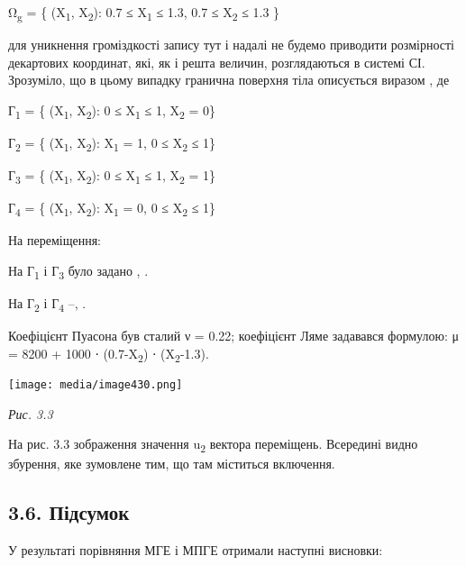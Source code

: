 Ω\textsubscript{g} = \{ (X\textsubscript{1}, X\textsubscript{2}): 0.7 ≤
X\textsubscript{1} ≤ 1.3, 0.7 ≤ X\textsubscript{2} ≤ 1.3 \}

для уникнення громіздкості запису тут і надалі не будемо приводити
розмірності декартових координат, які, як і решта величин, розглядаються
в системі СІ. Зрозуміло, що в цьому випадку гранична поверхня тіла
описується виразом , де

Г\textsubscript{1} = \{ (X\textsubscript{1}, X\textsubscript{2­}): 0 ≤
X\textsubscript{1} ≤ 1, X\textsubscript{2} = 0\}

Г\textsubscript{2} = \{ (X\textsubscript{1}, X\textsubscript{2­}):
X\textsubscript{1} = 1, 0 ≤ X\textsubscript{2} ≤ 1\}

Г\textsubscript{3} = \{ (X\textsubscript{1}, X\textsubscript{2­}): 0 ≤
X\textsubscript{1} ≤ 1, X\textsubscript{2} = 1\}

Г\textsubscript{4} = \{ (X\textsubscript{1}, X\textsubscript{2­}):
X\textsubscript{1} = 0, 0 ≤ X\textsubscript{2} ≤ 1\}

На переміщення:

На Г\textsubscript{1} і Г\textsubscript{3} було задано , .

На Г\textsubscript{2} і Г\textsubscript{4} --, .

Коефіцієнт Пуасона був сталий ν = 0.22; коефіцієнт Ляме задавався
формулою: μ = 8200 + 1000 ⋅ (0.7-X\textsubscript{2}) ⋅
(X\textsubscript{2}-1.3).

\texttt{[image: media/image430.png]}

\emph{Рис. 3.3}

На рис. 3.3 зображення значення u\textsubscript{2} вектора переміщень.
Всередині видно збурення, яке зумовлене тим, що там міститься включення.

\hypertarget{ux43fux456ux434ux441ux443ux43cux43eux43a-1}{%
\subsection{3.6.
Підсумок}\label{ux43fux456ux434ux441ux443ux43cux43eux43a-1}}

У результаті порівняння МГЕ і МПГЕ отримали наступні висновки:

